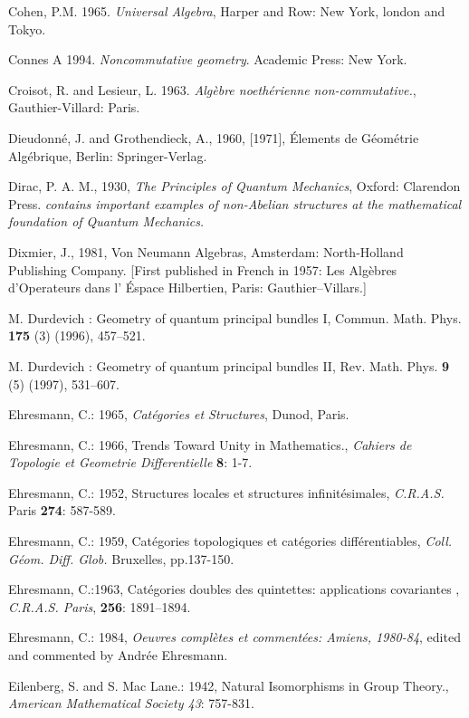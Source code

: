 \documentclass[12pt]{article}
\theoremstyle{plain}
\theoremstyle{definition}
\numberwithin{equation}{section}
\begin{document}
\begin{thebibliography}{9}
Cohen, P.M. 1965. {\em Universal Algebra}, Harper and Row: New York, london and Tokyo.

Connes A 1994. {\em Noncommutative geometry}. Academic Press: New York.

Croisot, R. and Lesieur, L. 1963. {\em Alg\`ebre noeth\'erienne non-commutative.},
Gauthier-Villard: Paris.

Dieudonn\'e, J. and Grothendieck, A., 1960, [1971], \'Elements de G\'eom\'etrie Alg\'ebrique, Berlin: Springer-Verlag.  

Dirac, P. A. M., 1930, {\em The Principles of Quantum Mechanics}, Oxford: Clarendon 
Press. {\em contains important examples of non-Abelian structures at the mathematical foundation of Quantum Mechanics.} 

Dixmier, J., 1981, Von Neumann Algebras, Amsterdam: North-Holland Publishing 
Company. [First published in French in 1957: Les Alg\`ebres d'Operateurs dans 
l' \'Espace Hilbertien, Paris: Gauthier--Villars.]

M. Durdevich : Geometry of quantum principal bundles I, Commun. Math. Phys. \textbf{175} (3) (1996), 457--521.

M. Durdevich : Geometry of quantum principal bundles II, Rev. Math. Phys. \textbf{9} (5) (1997), 531--607.

Ehresmann, C.: 1965, \emph{Cat\'egories et Structures}, Dunod, Paris.

Ehresmann, C.: 1966, Trends Toward Unity in Mathematics., \emph{Cahiers de Topologie et Geometrie Differentielle}
\textbf{8}: 1-7.

Ehresmann, C.: 1952, Structures locales et structures infinit\'esimales,
\emph{C.R.A.S.} Paris \textbf{274}: 587-589.

Ehresmann, C.: 1959, Cat\'egories topologiques et cat\'egories
diff\'erentiables, \emph{Coll. G\'eom. Diff. Glob.} Bruxelles, pp.137-150.

Ehresmann, C.:1963, Cat\'egories doubles des quintettes: applications covariantes
, \emph{C.R.A.S. Paris}, \textbf{256}: 1891--1894.

Ehresmann, C.: 1984, \emph{Oeuvres compl\`etes et  comment\'ees:
Amiens, 1980-84}, edited and commented by Andr\'ee Ehresmann.

Eilenberg, S. and S. Mac Lane.: 1942, Natural Isomorphisms in Group Theory., \emph{American Mathematical Society 43}: 757-831.


\end{thebibliography}
\end{document}
